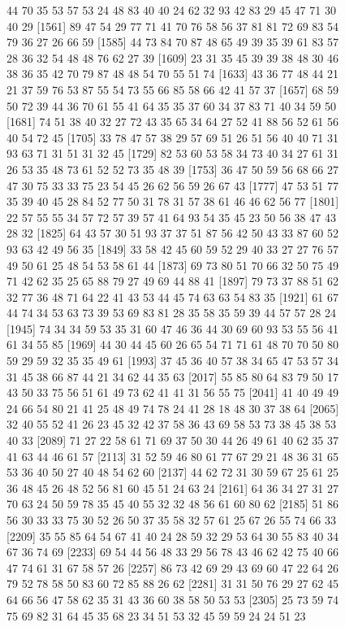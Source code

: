 \documentclass{article}
\begin{document}
\begin{figure}[H]
\begin{Schunk}
\begin{Soutput}
 [1537] 44 70 35 53 57 53 24 48 83 40 40 24 62 32 93 42 83 29 45 47 71 30 40 29
 [1561] 89 47 54 29 77 71 41 70 76 58 56 37 81 81 72 69 83 54 79 36 27 26 66 59
 [1585] 44 73 84 70 87 48 65 49 39 35 39 61 83 57 28 36 32 54 48 48 76 62 27 39
 [1609] 23 31 35 45 39 39 38 48 30 46 38 36 35 42 70 79 87 48 48 54 70 55 51 74
 [1633] 43 36 77 48 44 21 21 37 59 76 53 87 55 54 73 55 66 85 58 66 42 41 57 37
 [1657] 68 59 50 72 39 44 36 70 61 55 41 64 35 35 37 60 34 37 83 71 40 34 59 50
 [1681] 74 51 38 40 32 27 72 43 35 65 34 64 27 52 41 88 56 52 61 56 40 54 72 45
 [1705] 33 78 47 57 38 29 57 69 51 26 51 56 40 40 71 31 93 63 71 31 51 31 32 45
 [1729] 82 53 60 53 58 34 73 40 34 27 61 31 26 53 35 48 73 61 52 52 73 35 48 39
 [1753] 36 47 50 59 56 68 66 27 47 30 75 33 33 75 23 54 45 26 62 56 59 26 67 43
 [1777] 47 53 51 77 35 39 40 45 28 84 52 77 50 31 78 31 57 38 61 46 46 62 56 77
 [1801] 22 57 55 55 34 57 72 57 39 57 41 64 93 54 35 45 23 50 56 38 47 43 28 32
 [1825] 64 43 57 30 51 93 37 37 51 87 56 42 50 43 33 87 60 52 93 63 42 49 56 35
 [1849] 33 58 42 45 60 59 52 29 40 33 27 27 76 57 49 50 61 25 48 54 53 58 61 44
 [1873] 69 73 80 51 70 66 32 50 75 49 71 42 62 35 25 65 88 79 27 49 69 44 88 41
 [1897] 79 73 37 88 51 62 32 77 36 48 71 64 22 41 43 53 44 45 74 63 63 54 83 35
 [1921] 61 67 44 74 34 53 63 73 39 53 69 83 81 28 35 58 35 59 39 44 57 57 28 24
 [1945] 74 34 34 59 53 35 31 60 47 46 36 44 30 69 60 93 53 55 56 41 61 34 55 85
 [1969] 44 30 44 45 60 26 65 54 71 71 61 48 70 70 50 80 59 29 59 32 35 35 49 61
 [1993] 37 45 36 40 57 38 34 65 47 53 57 34 31 45 38 66 87 44 21 34 62 44 35 63
 [2017] 55 85 80 64 83 79 50 17 43 50 33 75 56 51 61 49 73 62 41 41 31 56 55 75
 [2041] 41 40 49 49 24 66 54 80 21 41 25 48 49 74 78 24 41 28 18 48 30 37 38 64
 [2065] 32 40 55 52 41 26 23 45 32 42 37 58 36 43 69 58 53 73 38 45 38 53 40 33
 [2089] 71 27 22 58 61 71 69 37 50 30 44 26 49 61 40 62 35 37 41 63 44 46 61 57
 [2113] 31 52 59 46 80 61 77 67 29 21 48 36 31 65 53 36 40 50 27 40 48 54 62 60
 [2137] 44 62 72 31 30 59 67 25 61 25 36 48 45 26 48 52 56 81 60 45 51 24 63 24
 [2161] 64 36 34 27 31 27 70 63 24 50 59 78 35 45 40 55 32 32 48 56 61 60 80 62
 [2185] 51 86 56 30 33 33 75 30 52 26 50 37 35 58 32 57 61 25 67 26 55 74 66 33
 [2209] 35 55 85 64 54 67 41 40 24 28 59 32 29 53 64 30 55 83 40 34 67 36 74 69
 [2233] 69 54 44 56 48 33 29 56 78 43 46 62 42 75 40 66 47 74 61 31 67 58 57 26
 [2257] 86 73 42 69 29 43 69 60 47 22 64 26 79 52 78 58 50 83 60 72 85 88 26 62
 [2281] 31 31 50 76 29 27 62 45 64 66 56 47 58 62 35 31 43 36 60 38 58 50 53 53
 [2305] 25 73 59 74 75 69 82 31 64 45 35 68 23 34 51 53 32 45 59 59 24 24 51 23

\end{Soutput}
\end{Schunk}
\end{figure}
\end{document}
